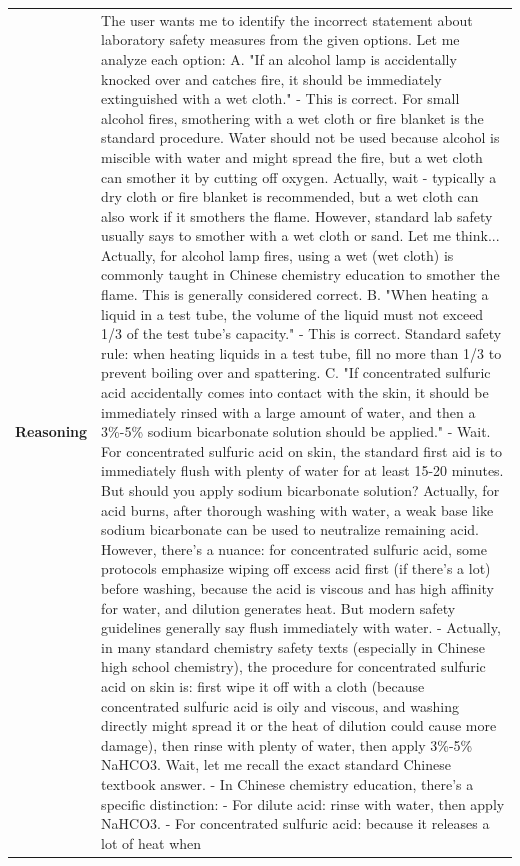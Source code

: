 \begin{longtable}{@{}l p{13cm}@{}}
  \textbf{Reasoning} & The user wants me to identify the incorrect statement about laboratory safety measures from the given options. \newline Let me analyze each option: \newline A. "If an alcohol lamp is accidentally knocked over and catches fire, it should be immediately extinguished with a wet cloth." \newline - This is correct. For small alcohol fires, smothering with a wet cloth or fire blanket is the standard procedure. Water should not be used because alcohol is miscible with water and might spread the fire, but a wet cloth can smother it by cutting off oxygen. Actually, wait - typically a dry cloth or fire blanket is recommended, but a wet cloth can also work if it smothers the flame. However, standard lab safety usually says to smother with a wet cloth or sand. Let me think... Actually, for alcohol lamp fires, using a wet (wet cloth) is commonly taught in Chinese chemistry education to smother the flame. This is generally considered correct. \newline B. "When heating a liquid in a test tube, the volume of the liquid must not exceed 1/3 of the test tube's capacity." \newline - This is correct. Standard safety rule: when heating liquids in a test tube, fill no more than 1/3 to prevent boiling over and spattering. \newline C. "If concentrated sulfuric acid accidentally comes into contact with the skin, it should be immediately rinsed with a large amount of water, and then a 3\%-5\% sodium bicarbonate solution should be applied." \newline - Wait. For concentrated sulfuric acid on skin, the standard first aid is to immediately flush with plenty of water for at least 15-20 minutes. But should you apply sodium bicarbonate solution? Actually, for acid burns, after thorough washing with water, a weak base like sodium bicarbonate can be used to neutralize remaining acid. However, there's a nuance: for concentrated sulfuric acid, some protocols emphasize wiping off excess acid first (if there's a lot) before washing, because the acid is viscous and has high affinity for water, and dilution generates heat. But modern safety guidelines generally say flush immediately with water. \newline - Actually, in many standard chemistry safety texts (especially in Chinese high school chemistry), the procedure for concentrated sulfuric acid on skin is: first wipe it off with a cloth (because concentrated sulfuric acid is oily and viscous, and washing directly might spread it or the heat of dilution could cause more damage), then rinse with plenty of water, then apply 3\%-5\% NaHCO3. Wait, let me recall the exact standard Chinese textbook answer. \newline - In Chinese chemistry education, there's a specific distinction: \newline - For dilute acid: rinse with water, then apply NaHCO3. \newline - For concentrated sulfuric acid: because it releases a lot of heat when 
\end{longtable}
